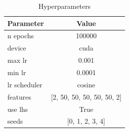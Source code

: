 \begin{table}[H]
    \centering
    \caption{Hyperparameters}
    \label{tab:hyper_params}
    \begin{tabular}{lc}
        \toprule
        \textbf{Parameter} & \textbf{Value} \\
        \midrule
        n epochs & 100000 \\
        device & cuda \\
        max lr & 0.001 \\
        min lr & 0.0001 \\
        lr scheduler & cosine \\
        features & [2, 50, 50, 50, 50, 50, 2] \\
        use lhs & True \\
        seeds & [0, 1, 2, 3, 4] \\
        \bottomrule
    \end{tabular}
\end{table}
